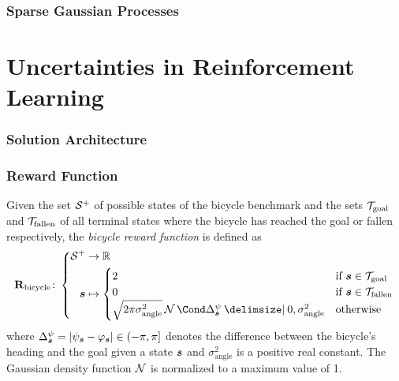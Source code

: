\begin{frame}[label=gp_sparse]
    \frametitle{Sparse Gaussian Processes}

    \centering
\end{frame}

\section{Uncertainties in Reinforcement Learning}
\begin{frame}[label=solution_architecture]
    \frametitle{Solution Architecture}

    \centering
    
\end{frame}

\begin{frame}[label=solution_reward]
    \frametitle{Reward Function}

    \begin{definition}
        Given the set $\mathcal{S}^+$ of possible states of the bicycle benchmark and the sets $\mathcal{T}_{\text{goal}}$ and $\mathcal{T}_{\text{fallen}}$ of all terminal states where the bicycle has reached the goal or fallen respectively, the \emph{bicycle reward function} is defined as
        \begin{align}
            \RwdBicycle \colon \left\{
                \begin{aligned}
                    \Es^+ &\to \R \\
                    \mat{s} &\mapsto \begin{cases}
                    2 & \text{if $\mat{s} \in \Goal$} \\
                    0 & \text{if $\mat{s} \in \Fallen$} \\
                    \sqrt{2\pi\sigma_{\text{angle}}^2}\Gaussian{\Delta^\psi_{\mat{s}} \given 0, \sigma_{\text{angle}}^2} & \text{otherwise}
                \end{cases}
            \end{aligned}
            \right.
        \end{align}
    where $\Delta^\psi_{\bm{s}} = \vert\psi_{\bm{s}} - \varphi_{\bm{s}}\vert \in (-\pi, \pi]$ denotes the difference between the bicycle's heading and the goal given a state $\bm{s}$ and $\sigma_{\text{angle}}^2$ is a positive real constant.
    The Gaussian density function $\operatorname{\mathcal{N}}$ is normalized to a maximum value of 1.
    \end{definition}
\end{frame}

